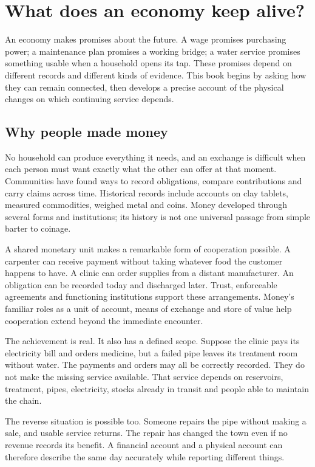 \chapter{What does an economy keep alive?}\label{ch:motivation}

An economy makes promises about the future. A wage promises purchasing power; a maintenance plan promises a working bridge; a water service promises something usable when a household opens its tap. These promises depend on different records and different kinds of evidence. This book begins by asking how they can remain connected, then develops a precise account of the physical changes on which continuing service depends.

\section{Why people made money}
No household can produce everything it needs, and an exchange is difficult when each person must want exactly what the other can offer at that moment. Communities have found ways to record obligations, compare contributions and carry claims across time. Historical records include accounts on clay tablets, measured commodities, weighed metal and coins. Money developed through several forms and institutions; its history is not one universal passage from simple barter to coinage.\cite{intro-money-history}

A shared monetary unit makes a remarkable form of cooperation possible. A carpenter can receive payment without taking whatever food the customer happens to have. A clinic can order supplies from a distant manufacturer. An obligation can be recorded today and discharged later. Trust, enforceable agreements and functioning institutions support these arrangements. Money's familiar roles as a unit of account, means of exchange and store of value help cooperation extend beyond the immediate encounter.\cite{intro-money-functions}

The achievement is real. It also has a defined scope. Suppose the clinic pays its electricity bill and orders medicine, but a failed pipe leaves its treatment room without water. The payments and orders may all be correctly recorded. They do not make the missing service available. That service depends on reservoirs, treatment, pipes, electricity, stocks already in transit and people able to maintain the chain.

The reverse situation is possible too. Someone repairs the pipe without making a sale, and usable service returns. The repair has changed the town even if no revenue records its benefit. A financial account and a physical account can therefore describe the same day accurately while reporting different things.

